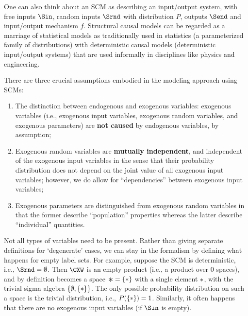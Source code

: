 One can also think about an SCM as describing an input/output system, with free inputs
$\Sin$, random inputs $\Srnd$ with distribution $P$, outputs $\Send$ and input/output mechanism $f$.
Structural causal models can be regarded as a marriage of statistical models as traditionally used in statistics (a parameterized family of distributions) with deterministic causal models (deterministic input/output systems) that are used informally in disciplines like physics and engineering.

\begin{Rem}
There are three crucial assumptions embodied in the modeling approach using SCMs:
\begin{enumerate}
  \item The distinction between endogenous and exogenous variables: exogenous variables
    (i.e., exogenous input variables, exogenous random variables, and exogenous parameters)
    are \textbf{not caused} by endogenous variables, by assumption;
  \item Exogenous random variables are \textbf{mutually independent}, and independent of the
    exogenous input variables in the sense that their probability distribution does
    not depend on the joint value of all exogenous input variables; however, we do
    allow for ``dependencies'' between exogenous input variables;
  \item Exogenous parameters are distinguished from exogenous random variables in that
    the former describe ``population'' properties whereas the latter describe ``individual''
    quantities.
\end{enumerate}
\end{Rem}

\begin{Rem}
  Not all types of variables need to be present. Rather than giving separate definitions for `degenerate' cases, we can stay in the formalism by defining what happens for empty label sets. For example, suppose the SCM is deterministic, i.e., $\Srnd = \emptyset$. Then $\CXW$ is an empty product (i.e., a product over 0 spaces), and by definition becomes a space $\Asterisk = \{\asterisk\}$ with a single element $*$, with the trivial sigma algebra $\{\emptyset,\{*\}\}$. The only possible probability distribution on such a space is the trivial distribution, i.e., $P(\{*\}) = 1$. Similarly, it often happens that there are no exogenous input variables (if $\Sin$ is empty).
\end{Rem}

